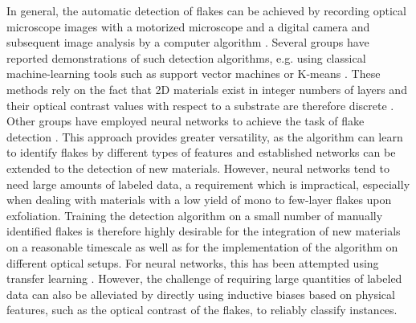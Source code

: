 \documentclass[reprint, prl, superscriptaddress, floatfix]{revtex4-2}
\begin{document}
In general, the automatic detection of flakes can be achieved by recording optical microscope images with a motorized microscope and a digital camera and subsequent image analysis by a computer algorithm \cite{Ryu2022}. 
Several groups have reported demonstrations of such detection algorithms, e.g. using classical machine-learning tools such as support vector machines or K-means \cite{Masubuchi2018, Lin2018Dec, Li2019Sep}.
These methods rely on the fact that 2D materials exist in integer numbers of layers and their optical contrast values with respect to a substrate are therefore discrete \cite{Blake2007}.
Other groups have employed neural networks to achieve the task of flake detection \cite{Saito2019Dec, Han2020Jul}. 
This approach provides greater versatility, as the algorithm can learn to identify flakes by different types of features and established networks can be extended to the detection of new materials. 
However, neural networks tend to need large amounts of labeled data, a requirement which is impractical, especially when dealing with materials with a low yield of mono to few-layer flakes upon exfoliation.
Training the detection algorithm on a small number of manually identified flakes is therefore highly desirable for the integration of new materials on a reasonable timescale as well as for the implementation of the algorithm on different optical setups.
For neural networks, this has been attempted using transfer learning \cite{Masubuchi2020Mar, Han2020Jul}.
However, the challenge of requiring large quantities of labeled data can also be alleviated by directly using inductive biases based on physical features, such as the optical contrast of the flakes, to reliably classify instances.
\end{document}
